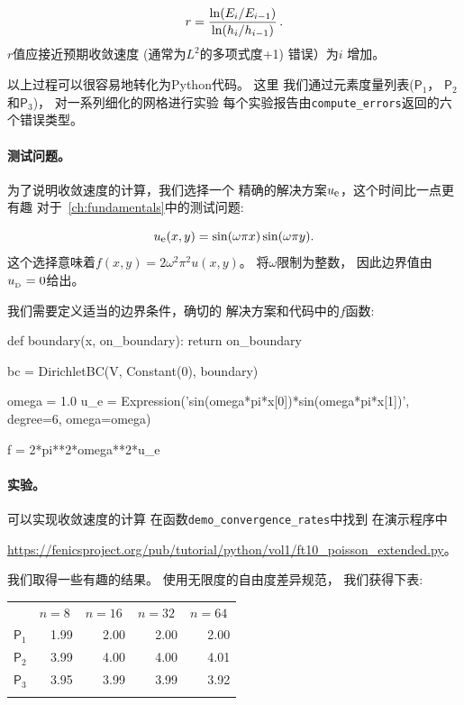 \begin{equation*}
r = {\ln(E_i/E_{i-1})\over\ln (h_i/h_{i-1})}\thinspace .
\end{equation*}
$r$值应接近预期收敛速度
(通常为$L^2$的多项式度+1)
错误）为$i$
增加。

以上过程可以很容易地转化为Python代码。 这里
我们通过元素度量列表($\mathsf{P}_1$，
$\mathsf{P}_2$和$\mathsf{P}_3$)，
对一系列细化的网格进行实验
每个实验报告由\verb!compute_errors!返回的六个错误类型。

\paragraph{测试问题。}
为了说明收敛速度的计算，我们选择一个
精确的解决方案$u_{\mbox{\footnotesize e}}$，这个时间比一点更有趣
对于~\ref{ch:fundamentals}中的测试问题:

\begin{equation*}
u_{\mbox{\footnotesize e}}(x,y) = \sin(\omega\pi x)\sin(\omega\pi y).
\end{equation*}
这个选择意味着$f(x,y)=2\omega^2\pi^2 u(x,y)$。
将$\omega$限制为整数，
因此边界值由$u_{_\mathrm{D}}=0$给出。

我们需要定义适当的边界条件，确切的
解决方案和代码中的$f$函数:

\begin{python}
def boundary(x, on_boundary):
    return on_boundary

bc = DirichletBC(V, Constant(0), boundary)

omega = 1.0
u_e = Expression('sin(omega*pi*x[0])*sin(omega*pi*x[1])',
                 degree=6, omega=omega)

f = 2*pi**2*omega**2*u_e
\end{python}

\paragraph{实验。}
可以实现收敛速度的计算
在函数\verb!demo_convergence_rates!中找到 在演示程序中
\begin{center}
\url{https://fenicsproject.org/pub/tutorial/python/vol1/ft10_poisson_extended.py}。
\end{center}
我们取得一些有趣的结果。
使用无限度的自由度差异规范，
我们获得下表:

{\small

\vspace{4mm}

\begin{tabular}{lrrrr}
\hline\noalign{\smallskip}
\multicolumn{1}{c}{ element } & \multicolumn{1}{c}{ $n=8\ $ } & \multicolumn{1}{c}{ $n=16\ $ } & \multicolumn{1}{c}{ $n=32\ $ } & \multicolumn{1}{c}{ $n=64\ $ } \\
\noalign{\smallskip}\hline\noalign{\smallskip}
$\mathsf{P}_1$ & 1.99    & 2.00     & 2.00     & 2.00     \\
$\mathsf{P}_2$ & 3.99    & 4.00     & 4.00     & 4.01     \\
$\mathsf{P}_3$ & 3.95    & 3.99     & 3.99     & 3.92     \\
\noalign{\smallskip}\hline\noalign{\smallskip}
\end{tabular}

\vspace{4mm}

}

